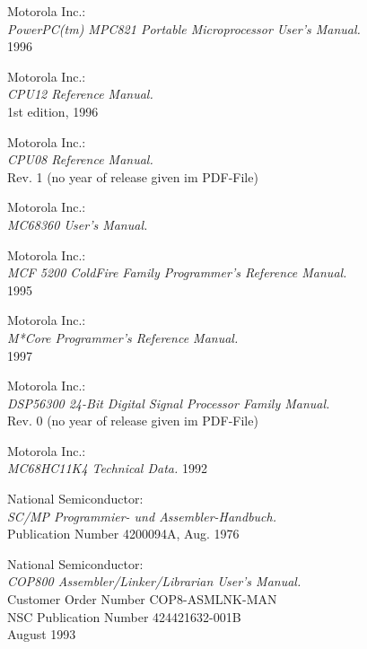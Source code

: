  Motorola Inc.: \\
                 {\em PowerPC(tm) MPC821 Portable Microprocessor User's Manual.\/} \\
                 1996

 Motorola Inc.: \\
                {\em CPU12 Reference Manual.\/} \\
                1st edition, 1996

 Motorola Inc.: \\
                {\em CPU08 Reference Manual.\/} \\
                Rev. 1 (no year of release given im PDF-File)

 Motorola Inc.: \\
                 {\em MC68360 User's Manual.\/}

 Motorola Inc.: \\
                  {\em MCF 5200 ColdFire Family Programmer's Reference
                   Manual.\/} \\
                  1995

 Motorola Inc.: \\
                   {\em M*Core Programmer's Reference Manual.\/} \\
                   1997

 Motorola Inc.: \\
                   {\em DSP56300 24-Bit Digital Signal Processor
                    Family Manual.\/} \\
                   Rev. 0 (no year of release given im PDF-File)

 Motorola Inc.: \\
                {\em MC68HC11K4 Technical Data.\/}
                1992

 National Semiconductor: \\
               {\em SC/MP Program\-mier- und
                As\-sem\-bler-Hand\-buch.\/} \\
               Publication Number 4200094A, Aug. 1976

 National Semiconductor: \\
                 {\em COP800 Assembler/Linker/Librarian User's
                 Manual.\/} \\
                 Customer Order Number COP8-ASMLNK-MAN \\
                 NSC Publication Number 424421632-001B \\
                 August 1993

